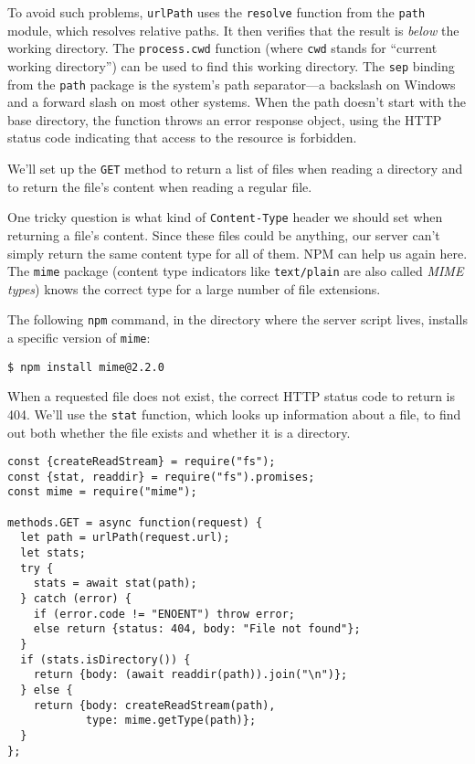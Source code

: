 To avoid such problems, \lstinline`urlPath` uses the \lstinline`resolve` function from the \lstinline`path` module, which resolves relative paths. It then verifies that the result is \emph{below} the working directory. The \lstinline`process.cwd` function (where \lstinline`cwd` stands for ``current working directory'') can be used to find this working directory. The \lstinline`sep` binding from the \lstinline`path` package is the system's path separator—a backslash on Windows and a forward slash on most other systems. When the path doesn't start with the base directory, the function throws an error response object, using the HTTP status code indicating that access to the resource is forbidden.

We'll set up the \lstinline`GET` method to return a list of files when reading a directory and to return the file's content when reading a regular file.

One tricky question is what kind of \lstinline`Content-Type` header we should set when returning a file's content. Since these files could be anything, our server can't simply return the same content type for all of them. NPM can help us again here. The \lstinline`mime` package (content type indicators like \lstinline`text/plain` are also called \emph{MIME types}) knows the correct type for a large number of file extensions.

The following \lstinline`npm` command, in the directory where the server script lives, installs a specific version of \lstinline`mime`:

\begin{lstlisting}
$ npm install mime@2.2.0
\end{lstlisting}
\noindent{}

When a requested file does not exist, the correct HTTP status code to return is 404. We'll use the \lstinline`stat` function, which looks up information about a file, to find out both whether the file exists and whether it is a directory.

\begin{lstlisting}
const {createReadStream} = require("fs");
const {stat, readdir} = require("fs").promises;
const mime = require("mime");

methods.GET = async function(request) {
  let path = urlPath(request.url);
  let stats;
  try {
    stats = await stat(path);
  } catch (error) {
    if (error.code != "ENOENT") throw error;
    else return {status: 404, body: "File not found"};
  }
  if (stats.isDirectory()) {
    return {body: (await readdir(path)).join("\n")};
  } else {
    return {body: createReadStream(path),
            type: mime.getType(path)};
  }
};
\end{lstlisting}
\noindent{}

